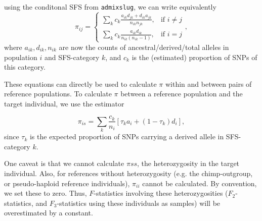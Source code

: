 \documentclass[10pt,a4paper]{article}
\begin{document}
using the conditonal SFS from \texttt{admixslug}, we can write equivalently
\begin{equation}
\pi_{ij} = \begin{cases}
\sum_k c_k \frac{a_{ik}d_{jk} + d_{ik}a_{jk}} {n_{ik}n_{jk}} ,& \text{if } i \neq j\\
\sum_k c_k \frac{a_{ik}d_{ik}}{n_{ik}(n_{ik} -1)},              & \text{if }i =j
\end{cases},
\end{equation}
where $a_{ik}, d_{ik}, n_{ik}$ are now the counts of ancestral/derived/total alleles in population $i$ and SFS-category $k$, and $c_k$ is the (estimated) proportion of SNPs of this category.

These equations can directly be used to calculate $\pi$ within and between pairs of reference populations. To calculate $\pi$ between a reference population and the target individual, we use the estimator

\begin{equation}
\pi_{is} = \sum_k \frac{c_k}{n_i} \left[\tau_k a_i+ (1-\tau_k) d_i\right],
\end{equation}
since $\tau_k$ is the expected proportion of SNPs carrying a derived allele in SFS-category $k$.


One caveat is that we cannot calculate $\pi{ss}$, the heterozygosity in the target individual. Also, for references without heterozygosity (e.g. the chimp-outgroup, or pseudo-haploid reference individuals), $\pi_{ii}$ cannot be calculated. By convention, we set these to zero. Thus, $F$-statistics involving these heterozygosities ($F_2$-statistics, and $F_3$-statistics using these individuals as samples) will be overestimated by a constant.



\end{document}
